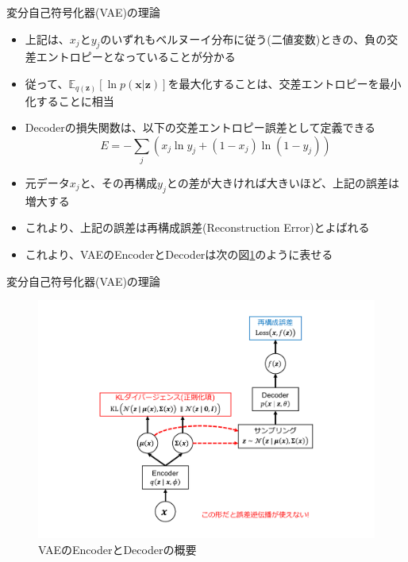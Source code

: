 \documentclass[dvipdfmx,notheorems,t]{beamer}
\begin{document}
\begin{frame}{変分自己符号化器(VAE)の理論}
\begin{itemize}
\begin{itemize}
		\item 上記は、$x_j$と$y_j$のいずれもベルヌーイ分布に従う(二値変数)ときの、\alert{負の交差エントロピー}となっていることが分かる
		\item 従って、$\mathbb{E}_{q(\bm{z})} \left[ \ln p(\bm{x} | \bm{z}) \right]$を最大化することは、\alert{交差エントロピーを最小化}することに相当
		\newline
		\item Decoderの損失関数は、以下の\alert{交差エントロピー誤差}として定義できる
		\begin{equation}
			E = - \sum_j \left( x_j \ln y_j + \left( 1 - x_j \right) \ln \left( 1 - y_j \right) \right)
		\end{equation}
		
		\item 元データ$x_j$と、その再構成$y_j$との\alert{差が大きければ大きいほど、上記の誤差は増大}する
		\item これより、上記の誤差は\alert{再構成誤差}(Reconstruction Error)とよばれる
		\newline
		
		\item これより、VAEのEncoderとDecoderは次の図\ref{fig:vae-architecture}のように表せる
	\end{itemize}
\end{itemize}

\end{frame}

\begin{frame}{変分自己符号化器(VAE)の理論}
	
\begin{figure}[h]
	\centering
	\includegraphics[keepaspectratio,scale=0.3,clip,trim=3cm 1cm 3cm 1cm]{vae-architecture.pdf}
	\caption{VAEのEncoderとDecoderの概要}
	\label{fig:vae-architecture}
\end{figure}

\end{frame}
\end{document}
